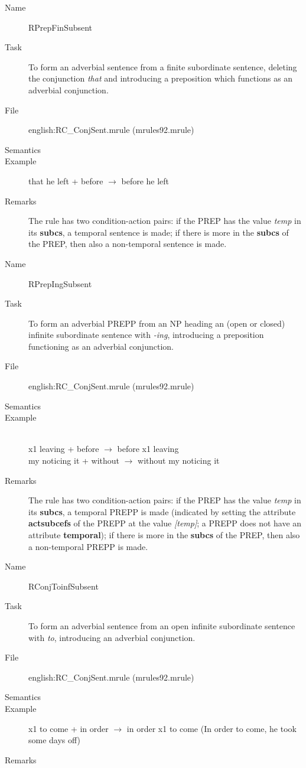\begin{description}
\vspace{1 cm}
\begin{description}
\item[Name] RPrepFinSubsent
\item[Task] To form an adverbial sentence from a finite subordinate 
sentence, deleting the conjunction {\em that\/} and introducing a 
preposition which functions as an adverbial conjunction.
\item[File] english:RC\_ConjSent.mrule (mrules92.mrule)
\item[Semantics]
\item[Example] that he left + before $\rightarrow$ before he left
\item[Remarks] The rule has two condition-action pairs: if the PREP has the 
value {\em temp\/} in its {\bf subcs}, a temporal sentence is made; if there is 
more in the {\bf subcs} of the PREP, then also a non-temporal sentence is made.
\end{description}

\vspace{1 cm}
\begin{description}
\item[Name] RPrepIngSubsent
\item[Task] To form an adverbial PREPP from an NP heading an (open or 
closed) infinite 
subordinate sentence with {\em -ing\/}, introducing a preposition functioning 
as an adverbial conjunction.
\item[File] english:RC\_ConjSent.mrule (mrules92.mrule)
\item[Semantics]
\item[Example] \mbox{}\\
x1 leaving + before $\rightarrow$ before x1 leaving\\
my noticing it + without $\rightarrow$ without my noticing it
\item[Remarks] The rule has two condition-action pairs: if the PREP has the 
value {\em temp\/} in its {\bf subcs}, a temporal PREPP is made (indicated by 
setting the attribute {\bf actsubcefs} of the PREPP at the value {\em 
[temp]\/}; a PREPP does not have an attribute {\bf temporal}); if there is 
more in the {\bf subcs} of the PREP, then also a non-temporal PREPP is made.
\end{description}

\vspace{1 cm}
\begin{description}
\item[Name] RConjToinfSubsent
\item[Task] To form an adverbial sentence from an open infinite subordinate 
sentence with {\em to\/}, introducing an adverbial conjunction.
\item[File] english:RC\_ConjSent.mrule (mrules92.mrule)
\item[Semantics]
\item[Example] x1 to come + in order $\rightarrow$ in order x1 to come (In 
order to come, he took some days off)
\item[Remarks]
\end{description}

\end{description}


